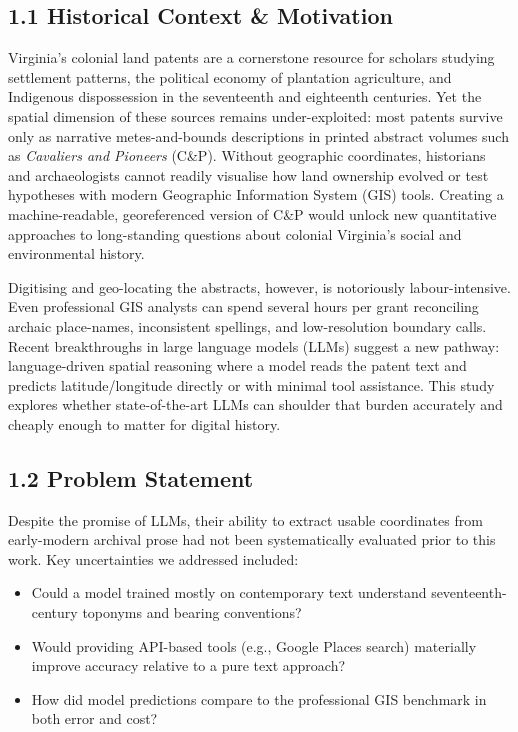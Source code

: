 \documentclass[
  11pt,
]{article}
\providecommand{\tightlist}{%
  \setlength{\itemsep}{0pt}\setlength{\parskip}{0pt}}
\begin{document}
\subsection{1.1 Historical Context \&
Motivation}\label{historical-context-motivation}

Virginia's colonial land patents are a cornerstone resource for scholars
studying settlement patterns, the political economy of plantation
agriculture, and Indigenous dispossession in the seventeenth and
eighteenth centuries. Yet the spatial dimension of these sources remains
under-exploited: most patents survive only as narrative metes-and-bounds
descriptions in printed abstract volumes such as \emph{Cavaliers and
Pioneers} (C\&P). Without geographic coordinates, historians and
archaeologists cannot readily visualise how land ownership evolved or
test hypotheses with modern Geographic Information System (GIS) tools.
Creating a machine-readable, georeferenced version of C\&P would unlock
new quantitative approaches to long-standing questions about colonial
Virginia's social and environmental history.

Digitising and geo-locating the abstracts, however, is notoriously
labour-intensive. Even professional GIS analysts can spend several hours
per grant reconciling archaic place-names, inconsistent spellings, and
low-resolution boundary calls. Recent breakthroughs in large language
models (LLMs) suggest a new pathway: language-driven spatial reasoning
where a model reads the patent text and predicts latitude/longitude
directly or with minimal tool assistance. This study explores whether
state-of-the-art LLMs can shoulder that burden accurately and cheaply
enough to matter for digital history.

\subsection{1.2 Problem Statement}\label{problem-statement}

Despite the promise of LLMs, their ability to extract usable coordinates
from early-modern archival prose had not been systematically evaluated
prior to this work. Key uncertainties we addressed included:

\begin{itemize}
\tightlist
\item
  Could a model trained mostly on contemporary text understand
  seventeenth-century toponyms and bearing conventions?\\
\item
  Would providing API-based tools (e.g., Google Places search)
  materially improve accuracy relative to a pure text approach?\\
\item
  How did model predictions compare to the professional GIS benchmark in
  both error and cost?
\end{itemize}
\end{document}
